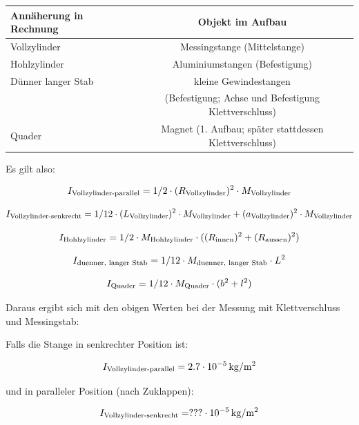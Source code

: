 \documentclass[11pt]{scrartcl}
\newcommand{\unit}[1]{\ensuremath{\,\mathrm{#1}}} %
\begin{document}
\begin{tabular}[ht]{|l|c|}
  \hline
  Ann\"aherung in Rechnung & Objekt im Aufbau\\
  \hline\hline
	Vollzylinder & Messingstange (Mittelstange)\\
	Hohlzylinder & Aluminiumstangen (Befestigung)\\
	D\"unner langer Stab & kleine Gewindestangen \\
	  & (Befestigung; Achse und Befestigung Klettverschluss)\\
	Quader & Magnet (1. Aufbau; sp\"ater stattdessen Klettverschluss)\\
  \hline
\end{tabular}


Es gilt also:

\[
I_{\textnormal{Vollzylinder-parallel}}=1/2 \cdot (R_{\textnormal{Vollzylinder}})^2 \cdot M_{\textnormal{Vollzylinder}}\]



\[I_{\textnormal{Vollzylinder-senkrecht}}=1/12 \cdot (L_{\textnormal{Vollzylinder}})^2 \cdot M_{\textnormal{Vollzylinder}} +(a_{\textnormal{Vollzylinder}})^2 \cdot M_{\textnormal{Vollzylinder}}\]


\[I_{\textnormal{Hohlzylinder}}=1/2 \cdot M_{\textnormal{Hohlzylinder}} \cdot ((R_{\textnormal{innen}})^2+(R_{\textnormal{aussen}})^2)\]


\[I_{\textnormal{duenner, langer Stab}}=1/12 \cdot M_{\textnormal{duenner, langer Stab}} \cdot L^2\]



\[I_{\textnormal{Quader}}=1/12 \cdot M_{\textnormal{Quader}} \cdot (b^2+l^2)\]

Daraus ergibt sich mit den obigen Werten bei der Messung mit Klettverschluss und Messingstab:


Falls die Stange in senkrechter Position ist:

\[I_{\textnormal{Vollzylinder-parallel}}=2.7 \cdot 10^{-5} \unit{kg/m^2}\]


und in paralleler Position (nach Zuklappen):

\[I_{\textnormal{Vollzylinder-senkrecht}}= ??? \cdot 10^{-5} \unit{kg/m^2}\]
\end{document}
